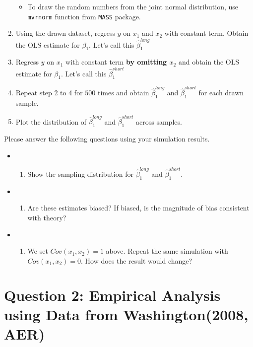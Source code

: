 \documentclass[]{book}
\providecommand{\tightlist}{%
  \setlength{\itemsep}{0pt}\setlength{\parskip}{0pt}}
\begin{document}
\begin{enumerate}
  \begin{itemize}
  \tightlist
  \item
    To draw the random numbers from the joint normal distribution, use
    \texttt{mvrnorm} function from \texttt{MASS} package.
  \end{itemize}
\item
  Using the drawn dataset, regress \(y\) on \(x_1\) and \(x_2\) with
  constant term. Obtain the OLS estimate for \(\beta_1\). Let's call
  this \(\hat\beta_1^{long}\)
\item
  Regress \(y\) on \(x_1\) with constant term \textbf{by omitting
  \(x_2\)} and obtain the OLS estimate for \(\beta_1\). Let's call this
  \(\hat\beta_1^{short}\)\\
\item
  Repeat step 2 to 4 for \(500\) times and obtain \(\hat\beta_1^{long}\)
  and \(\hat\beta_1^{short}\) for each drawn sample.
\item
  Plot the distribution of \(\hat\beta_1^{long}\) and
  \(\hat\beta_1^{short}\) across samples.
\end{enumerate}

Please answer the following questions using your simulation results.

\begin{itemize}
\item
  \begin{enumerate}
  \def\labelenumi{(\arabic{enumi})}
  \tightlist
  \item
    Show the sampling distribution for \(\hat\beta_1^{long}\) and
    \(\hat\beta_1^{short}\).
  \end{enumerate}
\item
  \begin{enumerate}
  \def\labelenumi{(\arabic{enumi})}
  \setcounter{enumi}{1}
  \tightlist
  \item
    Are these estimates biased? If biased, is the magnitude of bias
    consistent with theory?
  \end{enumerate}
\item
  \begin{enumerate}
  \def\labelenumi{(\arabic{enumi})}
  \setcounter{enumi}{2}
  \tightlist
  \item
    We set \(Cov(x_1, x_2)=1\) above. Repeat the same simulation with
    \(Cov(x_1, x_2)=0\). How does the result would change?
  \end{enumerate}
\end{itemize}

\section{Question 2: Empirical Analysis using Data from Washington(2008,
AER)}\label{question-2-empirical-analysis-using-data-from-washington2008-aer}
\end{document}
